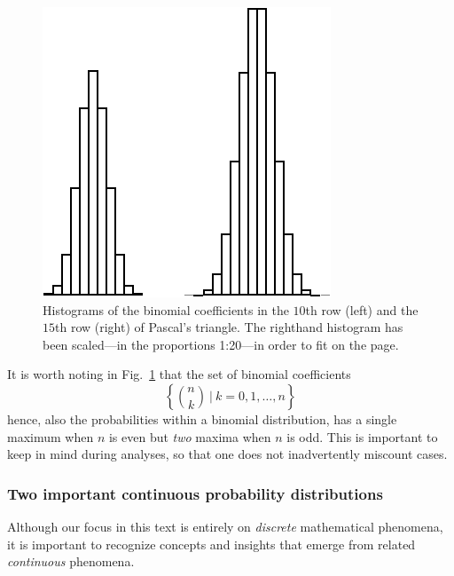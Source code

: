 \begin{figure}[htb]
\begin{center}
        \includegraphics[scale=0.5]{FiguresMaths/ProbaGaussianDistribution}
        \caption{Histograms of the binomial coefficients in the $10$th row (left) and the $15$th row (right) of Pascal's triangle.  The righthand histogram has been scaled---in the proportions 1:20---in order to fit on the page.}
        \label{fig:gaussiandistribution}
\end{center}
\end{figure}

It is worth noting in Fig.~\ref{fig:gaussiandistribution} that the set of binomial coefficients
\[ \left\{ {n \choose k} \ | \ k = 0, 1, \ldots, n \right\} \]
hence, also the probabilities within a binomial distribution, has a single maximum when $n$ is even but {\em two} maxima when $n$ is odd.  This is important to keep in mind during analyses, so that one does not inadvertently miscount cases.


\subsubsection{Two important continuous probability distributions}
\label{sec:normal-expon-distr}

  
 

Although our focus in this text is entirely on {\em discrete} mathematical phenomena, it is important to recognize concepts and insights that emerge from related {\em continuous} phenomena.

